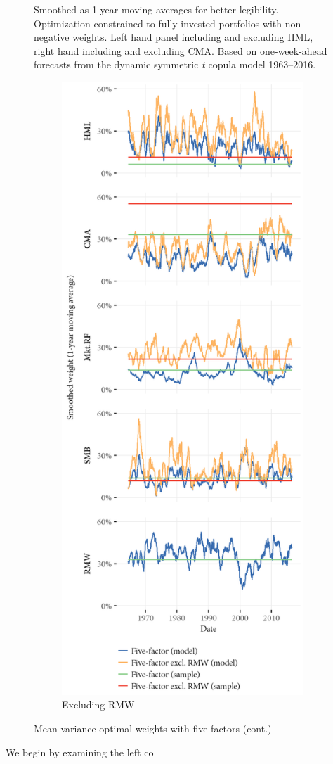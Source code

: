 \begin{figure}[htbp]
  \begin{longcaption}
    Smoothed as 1-year moving averages for better legibility. Optimization constrained to fully invested portfolios with non-negative weights. Left hand panel including and excluding HML, right hand including and excluding CMA. Based on one-week-ahead forecasts from the dynamic symmetric \emph{t} copula model 1963--2016.
  \end{longcaption}
\end{figure}

\begin{figure}[htbp]
  \ContinuedFloat
  \centering
  \begin{subfigure}{0.45\textwidth}
    \includegraphics[width=\textwidth]{graphics/weights/main_Weights_MV_5F_5F_EXCL_RMW.png}
    \caption{Excluding RMW}
  \end{subfigure}  
  \footnotesize
  \caption{Mean-variance optimal weights with five factors (cont.)}
\end{figure}

We begin by examining the left co